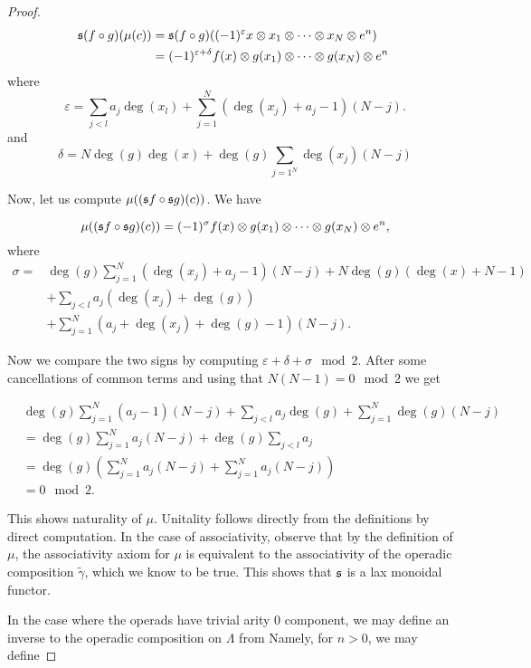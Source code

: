 \documentclass[Thesis.tex]{subfiles}
\begin{document}
\begin{proof}
\begin{align*}
\mathfrak{s}(f\circ g)(\mu(c))&=\mathfrak{s}(f\circ g)((-1)^{\varepsilon} x\otimes x_1\otimes\cdots\otimes x_N \otimes e^n)\\
&=(-1)^{\varepsilon+\delta}f(x)\otimes g(x_1)\otimes\cdots\otimes g(x_N) \otimes e^n\
\end{align*}
where
\[\varepsilon=\sum_{j<l}a_j\deg(x_l)+\sum_{j=1}^N (\deg(x_j)+a_j-1)(N-j).\]
and
\[\delta = N\deg(g)\deg(x)+\deg(g)\sum_{j=1^N}\deg(x_j)(N-j)\]


Now, let us compute $\mu((\mathfrak{s} f\circ \mathfrak{s}  g)(c))$. We have

\[\mu((\mathfrak{s} f\circ \mathfrak{s}  g)(c))=(-1)^\sigma f(x)\otimes g(x_1)\otimes\cdots\otimes g(x_N) \otimes e^n,\]
where 
\begin{align*}
\sigma=& \deg(g)\sum_{j=1}^N(\deg(x_j)+a_j-1)(N-j)+N\deg(g)(\deg(x)+N-1)\\
&+\sum_{j<l}a_j(\deg(x_j)+\deg(g))\\
&+\sum_{j=1}^N(a_j+\deg(x_j)+\deg(g)-1)(N-j).
\end{align*}
 
 Now we compare the two signs by computing $\varepsilon+\delta+\sigma\mod 2$. After some cancellations of common terms and using that $N(N-1)=0\mod 2$ we get
 
 \begin{align*}
 &\deg(g)\sum_{j=1}^N(a_j-1)(N-j)+\sum_{j<l}a_j\deg(g)+\sum_{j=1}^N\deg(g)(N-j)\\
 &=\deg(g)\sum_{j=1}^Na_j(N-j)+\deg(g)\sum_{j<l}a_j\\
 &=\deg(g)\left(\sum_{j=1}^N a_j(N-j)+\sum_{j=1}^N a_j(N-j)\right)\\
 &=0\mod 2.
 \end{align*}

 This shows naturality of $\mu$. %
 Unitality follows directly from the definitions by direct computation. In the case of associativity, observe that by the definition of $\mu$, the associativity axiom for $\mu$ is equivalent to the associativity of the operadic composition $\tilde{\gamma}$, which we know to be true. This shows that $\mathfrak{s}$ is a lax monoidal functor.
 
In the case where the operads have trivial arity 0 component, we may define an inverse to the operadic composition on $\Lambda$ from  Namely, for $n>0$, we may define


\end{proof}
\end{document}
